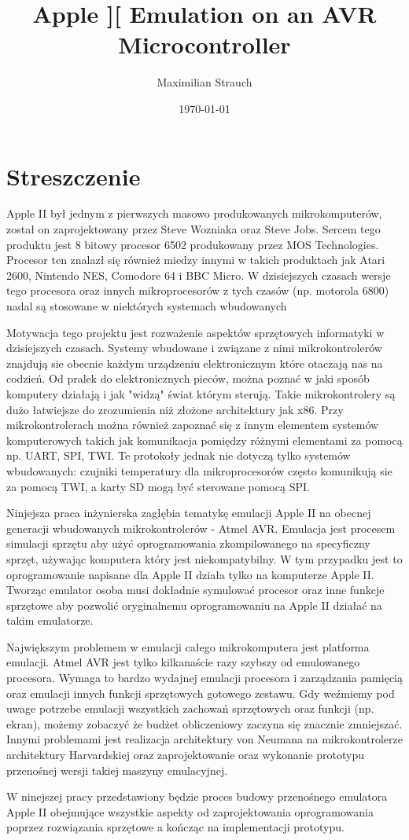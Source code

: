 \documentclass[11pt]{article}
\author{Maximilian Strauch}
\date{\today}
\title{Apple ][ Emulation on an AVR Microcontroller}
\begin{document}
\maketitle
\pagebreak
\section{Streszczenie}
\label{sec:orgda49e29}
Apple II był jednym z pierwszych masowo produkowanych mikrokomputerów, został on zaprojektowany przez Steve Wozniaka oraz Steve Jobs. Sercem tego produktu jest 8 bitowy procesor 6502 produkowany przez MOS Technologies. Procesor ten znalazł się również miedzy innymi w takich produktach jak Atari 2600, Nintendo NES, Comodore 64 i BBC Micro. W dzisiejszych czasach wersje tego procesora oraz innych mikroprocesorów z tych czasów (np. motorola 6800) nadal są stosowane w niektórych systemach wbudowanych

Motywacja tego projektu jest rozważenie aspektów sprzętowych informatyki w dzisiejszych czasach. Systemy wbudowane i związane z nimi mikrokontrolerów znajdują sie obecnie każdym urządzeniu elektronicznym które otaczają nas na codzień. Od pralek do elektronicznych pieców, można poznać w jaki sposób komputery działają i jak "widzą" świat którym sterują. Takie mikrokontrolery są dużo łatwiejsze do zrozumienia niż złożone architektury jak x86. Przy mikrokontrolerach można również zapoznać się z innym elementem systemów komputerowych takich jak komunikacja pomiędzy różnymi elementami za pomocą np. UART, SPI, TWI. Te protokoły jednak nie dotyczą tylko systemów wbudowanych: czujniki temperatury dla mikroprocesorów często komunikują sie za pomocą TWI, a karty SD mogą być sterowane pomocą SPI.

Ninjejsza praca inżynierska zagłębia tematykę emulacji Apple II na obecnej generacji wbudowanych mikrokontrolerów - Atmel AVR. Emulacja jest procesem simulacji sprzętu aby użyć oprogramowania zkompilowanego na specyficzny sprzęt, używając komputera który jest niekompatybilny. W tym przypadku jest to oprogramowanie napisane dla Apple II działa tylko na komputerze Apple II. Tworząc emulator osoba musi dokładnie symulować procesor oraz inne funkcje sprzętowe aby pozwolić oryginalnemu oprogramowaniu na Apple II działać na takim emulatorze.

Największym problemem w emulacji całego mikrokomputera jest platforma emulacji. Atmel AVR jest tylko kilkanaście razy szybszy od emulowanego procesora. Wymaga to bardzo wydajnej emulacji procesora i zarządzania pamięcią oraz emulacji innych funkcji sprzętowych gotowego zestawu. Gdy weźmiemy pod uwage potrzebe emulacji wszystkich zachowań sprzętowych oraz funkcji (np. ekran), możemy zobaczyć że budżet obliczeniowy zaczyna się znacznie zmniejszać. Innymi problemami jest realizacja architektury von Neumana na mikrokontrolerze architektury Harvardskiej oraz zaprojektowanie oraz wykonanie prototypu przenośnej wersji takiej maszyny emulacyjnej.

W ninejszej pracy przedstawiony będzie proces budowy przenośnego emulatora Apple II obejmujące wszystkie aspekty od zaprojektowania oprogramowania poprzez rozwiązania sprzętowe a kończąc na implementacji prototypu.
\end{document}
